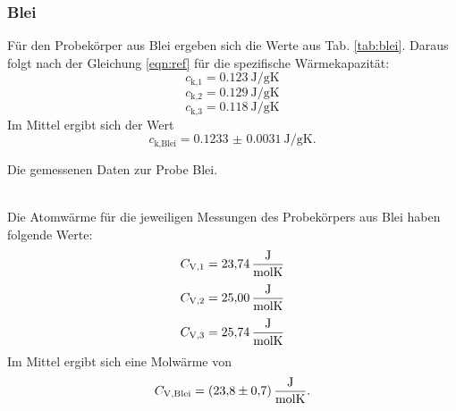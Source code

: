 \subsubsection{Blei}
Für den Probekörper aus Blei ergeben sich die Werte aus Tab. \ref{tab:blei}.
Daraus folgt nach der Gleichung \eqref{eqn:ref} für die spezifische Wärmekapazität:
\begin{equation*}
    c_\text{k,1} = \SI{0.123}{\joule/\gram\kelvin}
\end{equation*}
\begin{equation*}
    c_\text{k,2} = \SI{0.129}{\joule/\gram\kelvin}
\end{equation*}
\begin{equation*}
    c_\text{k,3} = \SI{0.118}{\joule/\gram\kelvin}
\end{equation*}
Im Mittel ergibt sich der Wert
\begin{equation}
    c_\text{k,Blei} = \SI{0.1233(31)}{\joule/\gram\kelvin}.
\end{equation}
\begin{table}
    \centering
    \caption{Die gemessenen Daten zur Probe Blei. }
    \label{tab:blei}  
\end{table}
\\
Die Atomwärme für die jeweiligen Messungen des Probekörpers aus Blei haben folgende Werte:
\begin{equation*}
    C_\text{V,1} = \SI{23.74}{\frac{\joule}{\mol\kelvin}}
\end{equation*}
\begin{equation*}
    C_\text{V,2} = \SI{25.00}{\frac{\joule}{\mol\kelvin}}
\end{equation*}
\begin{equation*}
    C_\text{V,3} = \SI{25.74}{\frac{\joule}{\mol\kelvin}}
\end{equation*}
Im Mittel ergibt sich eine Molwärme von
\begin{equation}
    C_\text{V,Blei} = \SI{23.8(7)}{\frac{\joule}{\mol\kelvin}} .
\end{equation}

